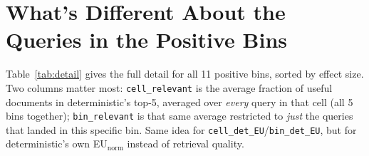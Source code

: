 \documentclass[10pt]{article}
\begin{document}
\FloatBarrier
\section{What's Different About the Queries in the Positive Bins}
\label{sec:detail}

Table~\ref{tab:detail} gives the full detail for all 11 positive bins, sorted by
effect size. Two columns matter most: \texttt{cell\_relevant} is the average
fraction of useful documents in deterministic's top-5, averaged over \emph{every}
query in that cell (all 5 bins together); \texttt{bin\_relevant} is that same
average restricted to \emph{just} the queries that landed in this specific bin.
Same idea for \texttt{cell\_det\_EU}/\texttt{bin\_det\_EU}, but for deterministic's
own EU$_{\text{norm}}$ instead of retrieval quality.
\end{document}
